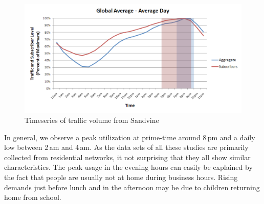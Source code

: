 \begin{figure}[tbp]
\centering
\includegraphics[width=0.85\linewidth]{figures-pdf/sandvine-tod}
\renewcommand{\capname}{Timeseries of traffic volume from Sandvine\xspace}
\caption[\capname]{\capname~\cite{sandvine}}
\label{fig:related:tod-sandvine}
\end{figure}

In general, we observe a peak utilization at prime-time around 8\,pm and a
daily low between 2\,am and 4\,am. As the data sets of all these studies are
primarily collected from residential networks, it not surprising that they all
show similar characteristics. The peak usage in the evening hours can easily be
explained by the fact that people are usually not at home during business
hours. Rising demands just before lunch and in the afternoon may be due to
children returning home from school.

